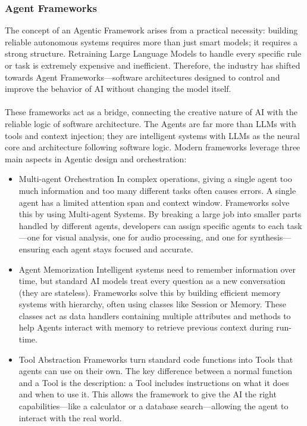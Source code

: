 \subsubsection{Agent Frameworks}
The concept of an Agentic Framework arises from a practical necessity: building reliable autonomous systems requires more than just smart models; it requires a strong structure. Retraining Large Language Models to handle every specific rule or task is extremely expensive and inefficient. Therefore, the industry has shifted towards Agent Frameworks—software architectures designed to control and improve the behavior of AI without changing the model itself.\\\\
These frameworks act as a bridge, connecting the creative nature of AI with the reliable logic of software architecture. The Agents are far more than LLMs with tools and context injection; they are intelligent systems with LLMs as the neural core and architecture following software logic. Modern frameworks leverage three main aspects in Agentic design and orchestration:
\begin{itemize}

\item{Multi-agent Orchestration}
In complex operations, giving a single agent too much information and too many different tasks often causes errors. A single agent has a limited attention span and context window. Frameworks solve this by using Multi-agent Systems. By breaking a large job into smaller parts handled by different agents, developers can assign specific agents to each task—one for visual analysis, one for audio processing, and one for synthesis—ensuring each agent stays focused and accurate.

\item{Agent Memorization}
Intelligent systems need to remember information over time, but standard AI models treat every question as a new conversation (they are stateless). Frameworks solve this by building efficient memory systems with hierarchy, often using classes like Session or Memory. These classes act as data handlers containing multiple attributes and methods to help Agents interact with memory to retrieve previous context during run-time.

\item{Tool Abstraction}
Frameworks turn standard code functions into Tools that agents can use on their own. The key difference between a normal function and a Tool is the description: a Tool includes instructions on what it does and when to use it. This allows the framework to give the AI the right capabilities—like a calculator or a database search—allowing the agent to interact with the real world.
\end{itemize}
